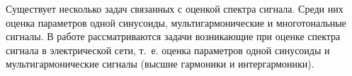 %
% 
%

Существует несколько задач связанных с оценкой спектра сигнала. Среди них оценка параметров одной синусоиды, мультигармонические и многотональные сигналы. В работе рассматриваются задачи возникающие при оценке спектра сигнала в электрической сети, т.~е. оценка параметров одной синусоиды и мультигармонические сигналы (высшие гармоники и интергармоники).

